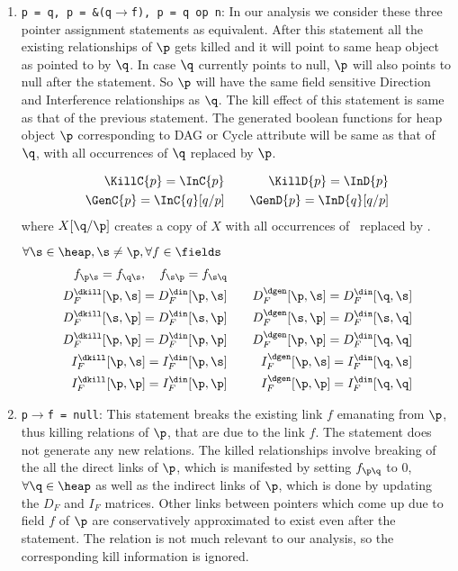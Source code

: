 \begin{enumerate}
\item{\tt p = q, p = \&(q$\rightarrow$f), p = q op n}:
In our analysis  we consider these three pointer assignment statements as
  equivalent. 
After this statement all the existing relationships of $\p$ gets
killed and it will point to same heap object as pointed to
by $\q$. In case $\q$ currently points to null, $\p$ will also points
to null after the statement. So $\p$ will have the same field
sensitive Direction and Interference relationships as $\q$. 
The kill effect of this statement is same as that of the previous statement. 
The generated boolean functions for heap object $\p$ corresponding 
to DAG or Cycle attribute will be same as that of $\q$, with all occurrences of $\q$ 
replaced by $\p$.

\begin{eqnarray*}
  \KillC{p} = \InC{p} &\quad& \KillD{p} = \InD{p} \\ 
  \GenC{p}   = \InC{q}[q/p]
  &\quad& \GenD{p} = \InD{q}[q/p] 
\end{eqnarray*}
{where $X[\q/\p]$ creates a copy of $X$ with all occurrences
  of \q\ replaced by \p.}

$\forall \s \in \heap, \s \not= \p, \forall f \in \fields$  
\begin{eqnarray*}
  f_{\p\s} = f_{\q\s},  \quad  f_{\s\p} = f_{\s\q} \\
  D_F^{\dkill}[\p,\s]  =  D_F^{\din}[\p,\s] &\quad&
  D_F^{\dgen}[\p,\s]    =  D_F^{\din}[\q,\s]   \\ 
  D_F^{\dkill}[\s,\p]  =  D_F^{\din}[\s,\p] &\quad&
  D_F^{\dgen}[\s,\p]    =  D_F^{\din}[\s,\q]   \\
  D_F^{\dkill}[\p,\p]  =  D_F^{\din}[\p,\p] &\quad&
  D_F^{\dgen}[\p,\p]    =  D_F^{\din}[\q,\q]  \rule{0mm}{0pt}\\
  I_F^{\dkill}[\p,\s]  =  I_F^{\din}[\p,\s] &\quad&
  I_F^{\dgen}[\p,\s]    =   I_F^{\din}[\q,\s] \\
  I_F^{\dkill}[\p,\p]  =  I_F^{\din}[\p,\p] &\quad&
  I_F^{\dgen}[\p,\p]    = I_F^{\din}[\q,\q] 
\end{eqnarray*}

\item {\tt p$\rightarrow$f = null}:
This statement breaks the existing link $f$ emanating from
$\p$, thus killing relations of $\p$, that are due to the link
$f$. The statement does not generate any new relations. The killed
relationships involve breaking of the all the direct links
of $\p$, which is manifested by setting $f_{\p\q}$ to 0, $\forall \q \in \heap$ 
as well as the indirect links of $\p$, which is done by updating the $D_F$ and $I_F$
matrices. Other links between pointers which come up
due to field $f$ of $\p$ are conservatively approximated to exist even after the statement. 
The relation \IFM{\p}{\p} is not much relevant to our analysis, so the corresponding
kill information is ignored. 


\end{enumerate}
